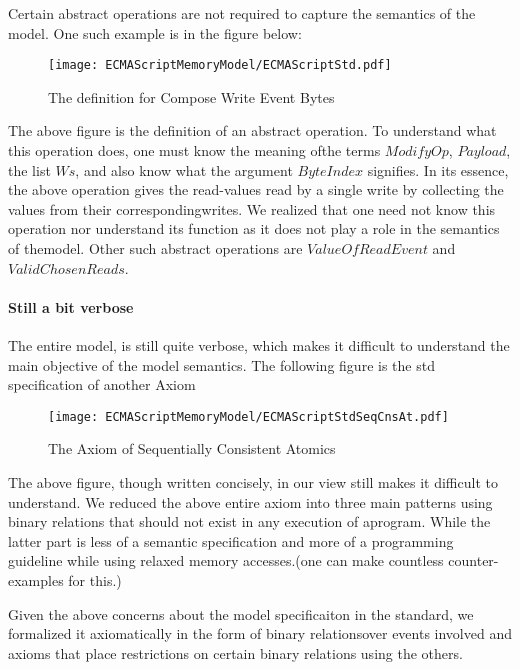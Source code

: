     Certain abstract operations are not required to capture the semantics of the model. 
    One such example is in the figure below:
    \begin{figure}[H]
        \centering 
        \texttt{[image: ECMAScriptMemoryModel/ECMAScriptStd.pdf]}
        \caption{The definition for Compose Write Event Bytes}
    \end{figure}
    The above figure is the definition of an abstract operation. To understand what this operation does, one must know the meaning ofthe terms $ModifyOp$, $Payload$, the list $Ws$, and also know what the argument $ByteIndex$ signifies. 
    In its essence, the above operation gives the read-values read by a single write by collecting the values from their correspondingwrites. 
    We realized that one need not know this operation nor understand its function as it does not play a role in the semantics of themodel. 
    Other such abstract operations are $ValueOfReadEvent$ and $ValidChosenReads$. 

\paragraph{Still a bit verbose}
    
    The entire model, is still quite verbose, which makes it difficult to understand the main objective of the model semantics. 
    The following figure is the std specification of another Axiom 
    \begin{figure}[H]
        \centering 
        \texttt{[image: ECMAScriptMemoryModel/ECMAScriptStdSeqCnsAt.pdf]}
        \caption{The Axiom of Sequentially Consistent Atomics}
    \end{figure}
    The above figure, though written concisely, in our view still makes it difficult to understand. 
    We reduced the above entire axiom into three main patterns using binary relations that should not exist in any execution of aprogram. 
    While the latter part is less of a semantic specification and more of a programming guideline while using relaxed memory accesses.(one can make countless counter-examples for this.) 

Given the above concerns about the model specificaiton in the standard, we formalized it axiomatically in the form of binary relationsover events involved and axioms that place restrictions on certain binary relations using the others. 


